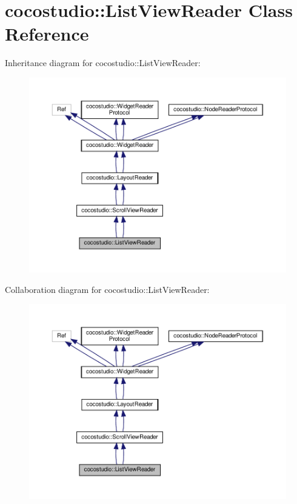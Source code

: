 \hypertarget{classcocostudio_1_1ListViewReader}{}\section{cocostudio\+:\+:List\+View\+Reader Class Reference}
\label{classcocostudio_1_1ListViewReader}


Inheritance diagram for cocostudio\+:\+:List\+View\+Reader\+:
\nopagebreak
\begin{figure}[H]
\begin{center}
\leavevmode
\includegraphics[width=350pt]{classcocostudio_1_1ListViewReader__inherit__graph}
\end{center}
\end{figure}


Collaboration diagram for cocostudio\+:\+:List\+View\+Reader\+:
\nopagebreak
\begin{figure}[H]
\begin{center}
\leavevmode
\includegraphics[width=350pt]{classcocostudio_1_1ListViewReader__coll__graph}
\end{center}
\end{figure}
